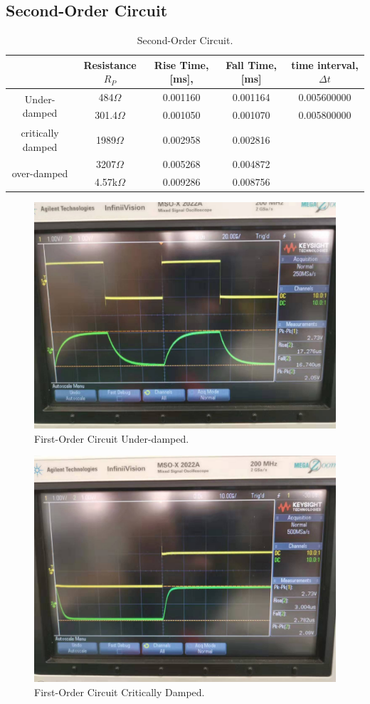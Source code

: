 \documentclass[a4paper]{report}
\begin{document}
	\subsection{Second-Order Circuit}
	\begin{table}[H]
		\centering
		\begin{tabular}{|c|c|c|c|c|}
			\hline
			&Resistance $R_P$&Rise Time, [ms],&Fall Time, [ms]&time interval, $\Delta t$\\
			\hline
			\multirow{2}{*}{Under-damped}&484$\Omega$&0.001160&0.001164&0.005600000\\
			\cline{2-5}
			&301.4$\Omega$&0.001050&0.001070&0.005800000\\
			\hline
			critically damped&1989$\Omega$&0.002958&0.002816&\\
			\hline
			\multirow{2}{*}{over-damped}&3207$\Omega$&0.005268&0.004872&\\
			\cline{2-5}
			&4.57k$\Omega$&0.009286&0.008756&\\
			\hline
		\end{tabular}
		\caption{Second-Order Circuit.}
	\end{table}
	\begin{figure}[H]
		\centering
		\includegraphics[width=0.8\linewidth]{4.jpg}
		\caption{First-Order Circuit Under-damped.}
	\end{figure}
	\begin{figure}[H]
		\centering
		\includegraphics[width=0.8\linewidth]{5.jpg}
		\caption{First-Order Circuit Critically Damped.}
	\end{figure}
\end{document}
